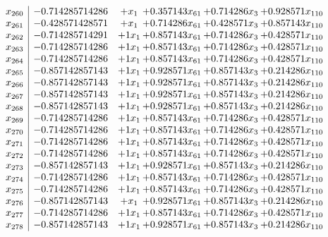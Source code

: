 \documentclass[11pt]{article}
\begin{document}
\[\begin{array}{c| c c@{\hskip 2pt} c@{\hskip 2pt} c@{\hskip 2pt} c@{\hskip 2pt} }
 x_{260}   &  -0.714285714286 & +  x_{1} & + 0.357143 x_{61} & + 0.714286 x_{3} & + 0.928571 x_{110}\\
 x_{261}   &  -0.428571428571 & +  x_{1} & + 0.714286 x_{61} & + 0.428571 x_{3} & + 0.857143 x_{110}\\
 x_{262}   &  -0.714285714291 & + 1 x_{1} & + 0.857143 x_{61} & + 0.714286 x_{3} & + 0.428571 x_{110}\\
 x_{263}   &  -0.714285714286 & + 1 x_{1} & + 0.857143 x_{61} & + 0.714286 x_{3} & + 0.428571 x_{110}\\
 x_{264}   &  -0.714285714286 & + 1 x_{1} & + 0.857143 x_{61} & + 0.714286 x_{3} & + 0.428571 x_{110}\\
 x_{265}   &  -0.857142857143 & + 1 x_{1} & + 0.928571 x_{61} & + 0.857143 x_{3} & + 0.214286 x_{110}\\
 x_{266}   &  -0.857142857143 & + 1 x_{1} & + 0.928571 x_{61} & + 0.857143 x_{3} & + 0.214286 x_{110}\\
 x_{267}   &  -0.857142857143 & + 1 x_{1} & + 0.928571 x_{61} & + 0.857143 x_{3} & + 0.214286 x_{110}\\
 x_{268}   &  -0.857142857143 & + 1 x_{1} & + 0.928571 x_{61} & + 0.857143 x_{3} & + 0.214286 x_{110}\\
 x_{269}   &  -0.714285714286 & + 1 x_{1} & + 0.857143 x_{61} & + 0.714286 x_{3} & + 0.428571 x_{110}\\
 x_{270}   &  -0.714285714286 & + 1 x_{1} & + 0.857143 x_{61} & + 0.714286 x_{3} & + 0.428571 x_{110}\\
 x_{271}   &  -0.714285714286 & + 1 x_{1} & + 0.857143 x_{61} & + 0.714286 x_{3} & + 0.428571 x_{110}\\
 x_{272}   &  -0.714285714286 & + 1 x_{1} & + 0.857143 x_{61} & + 0.714286 x_{3} & + 0.428571 x_{110}\\
 x_{273}   &  -0.857142857143 & + 1 x_{1} & + 0.928571 x_{61} & + 0.857143 x_{3} & + 0.214286 x_{110}\\
 x_{274}   &  -0.714285714286 & + 1 x_{1} & + 0.857143 x_{61} & + 0.714286 x_{3} & + 0.428571 x_{110}\\
 x_{275}   &  -0.714285714286 & + 1 x_{1} & + 0.857143 x_{61} & + 0.714286 x_{3} & + 0.428571 x_{110}\\
 x_{276}   &  -0.857142857143 & +  x_{1} & + 0.928571 x_{61} & + 0.857143 x_{3} & + 0.214286 x_{110}\\
 x_{277}   &  -0.714285714286 & + 1 x_{1} & + 0.857143 x_{61} & + 0.714286 x_{3} & + 0.428571 x_{110}\\
 x_{278}   &  -0.857142857143 & + 1 x_{1} & + 0.928571 x_{61} & + 0.857143 x_{3} & + 0.214286 x_{110}\\

\end{array}\]
\end{document}
